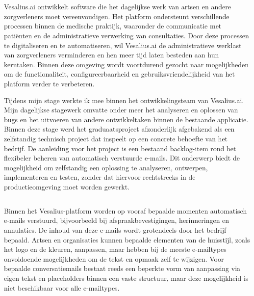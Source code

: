 \chapter{}%
\label{ch:inleiding}
Vesalius.ai ontwikkelt software die het dagelijkse werk van artsen en andere
zorgverleners moet vereenvoudigen. Het platform ondersteunt verschillende
processen binnen de medische praktijk, waaronder de communicatie met patiënten
en de administratieve verwerking van consultaties. Door deze processen te
digitaliseren en te automatiseren, wil Vesalius.ai de administratieve werklast
van zorgverleners verminderen en hen meer tijd laten besteden aan hun kerntaken.
Binnen deze omgeving wordt voortdurend gezocht naar mogelijkheden om de
functionaliteit, configureerbaarheid en gebruiksvriendelijkheid van het
platform verder te verbeteren.

Tijdens mijn stage werkte ik mee binnen het ontwikkelingsteam van Vesalius.ai.
Mijn dagelijkse stagewerk omvatte onder meer het analyseren en oplossen van
bugs en het uitvoeren van andere ontwikkeltaken binnen de bestaande applicatie.
Binnen deze stage werd het graduaatsproject afzonderlijk afgebakend als een
zelfstandig technisch project dat inspeelt op een concrete behoefte van het
bedrijf. De aanleiding voor het project is een bestaand backlog-item rond het
flexibeler beheren van automatisch verstuurde e-mails. Dit onderwerp biedt de
mogelijkheid om zelfstandig een oplossing te analyseren, ontwerpen,
implementeren en testen, zonder dat hiervoor rechtstreeks in de
productieomgeving moet worden gewerkt.

\section{}%
\label{sec:probleemstelling}
Binnen het Vesalius-platform worden op vooraf bepaalde momenten automatisch
e-mails verstuurd, bijvoorbeeld bij afspraakbevestigingen, herinneringen en
annulaties. De inhoud van deze e-mails wordt grotendeels door het bedrijf
bepaald. Artsen en organisaties kunnen bepaalde elementen van de huisstijl,
zoals het logo en de kleuren, aanpassen, maar hebben bij de meeste e-mailtypes
onvoldoende mogelijkheden om de tekst en opmaak zelf te wijzigen. Voor
bepaalde conversatiemails bestaat reeds een beperkte vorm van aanpassing via
eigen tekst en placeholders binnen een vaste structuur, maar deze
mogelijkheid is niet beschikbaar voor alle e-mailtypes.

